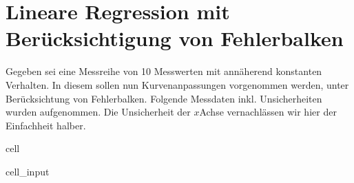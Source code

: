 \documentclass[letterpaper,10pt,english]{jupyterBook}
\begin{document}
\sphinxstepscope


\section{Lineare Regression mit Berücksichtigung von Fehlerbalken}
\label{\detokenize{content/T_FitmitFehlerbalken:lineare-regression-mit-berucksichtigung-von-fehlerbalken}}\label{\detokenize{content/T_FitmitFehlerbalken::doc}}
\sphinxAtStartPar
Gegeben sei eine Messreihe von 10 Messwerten mit annäherend konstanten Verhalten. In diesem sollen nun Kurvenanpassungen vorgenommen werden, unter Berücksichtung von Fehlerbalken. Folgende Messdaten inkl. Unsicherheiten wurden aufgenommen. Die Unsicherheit der \(x\)\sphinxhyphen{}Achse vernachlässen wir hier der Einfachheit halber.

\begin{sphinxuseclass}{cell}\begin{sphinxVerbatimInput}

\begin{sphinxuseclass}{cell_input}
\begin{sphinxVerbatim}[commandchars=\\\{\}]
   
   
 
 
\PYG{p}{[}\PYG{p}{]}   

  \PYG{p}{[}         \PYG{p}{]} 
  \PYG{p}{[}         \PYG{p}{]} 
  \PYG{p}{[}         \PYG{p}{]} 


\end{sphinxVerbatim}
\end{sphinxuseclass}
\end{sphinxVerbatimInput}
\end{sphinxuseclass}
\end{document}
